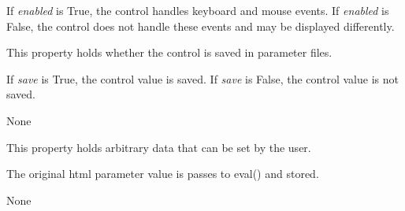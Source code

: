 \documentclass[letterpaper,10pt,english]{sphinxmanual}
\begin{document}
\begin{fulllineitems}
\begin{fulllineitems}
If \emph{enabled} is True, the control handles keyboard and mouse events.
If \emph{enabled} is False, the control does not handle these events and may
be displayed differently.

\end{fulllineitems}


\begin{fulllineitems}
\label{api:controls.ChoiceBox.save}
This property holds whether the control is saved in parameter files.

If \emph{save} is True, the control value is saved.
If \emph{save} is False, the control value is not saved.

\end{fulllineitems}


\begin{fulllineitems}
\label{api:controls.ChoiceBox.set_first_visible_item}
None

\end{fulllineitems}


\begin{fulllineitems}
\label{api:controls.ChoiceBox.user}
This property holds arbitrary data that can be set by the user.

The original html parameter value is passes to eval() and stored.

\end{fulllineitems}


\begin{fulllineitems}
\label{api:controls.ChoiceBox.value}
None

\end{fulllineitems}


\end{fulllineitems}

\end{document}
